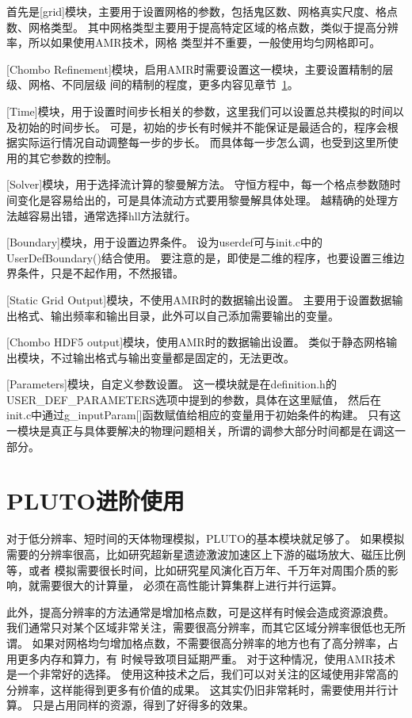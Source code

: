 首先是[grid]模块，主要用于设置网格的参数，包括鬼区数、网格真实尺度、格点数、网格类型。
其中网格类型主要用于提高特定区域的格点数，类似于提高分辨率，所以如果使用AMR技术，网格
类型并不重要，一般使用均匀网格即可。

[Chombo Refinement]模块，启用AMR时需要设置这一模块，主要设置精制的层级、网格、不同层级
间的精制的程度，更多内容见章节~\ref{PLUTOmore}。

[Time]模块，用于设置时间步长相关的参数，这里我们可以设置总共模拟的时间以及初始的时间步长。
可是，初始的步长有时候并不能保证是最适合的，程序会根据实际运行情况自动调整每一步的步长。
而具体每一步怎么调，也受到这里所使用的其它参数的控制。

[Solver]模块，用于选择流计算的黎曼解方法。
守恒方程中，每一个格点参数随时间变化是容易给出的，可是具体流动方式要用黎曼解具体处理。
越精确的处理方法越容易出错，通常选择hll方法就行。

[Boundary]模块，用于设置边界条件。
设为userdef可与init.c中的UserDefBoundary()结合使用。
要注意的是，即使是二维的程序，也要设置三维边界条件，只是不起作用，不然报错。

[Static Grid Output]模块，不使用AMR时的数据输出设置。
主要用于设置数据输出格式、输出频率和输出目录，此外可以自己添加需要输出的变量。

[Chombo HDF5 output]模块，使用AMR时的数据输出设置。
类似于静态网格输出模块，不过输出格式与输出变量都是固定的，无法更改。

[Parameters]模块，自定义参数设置。
这一模块就是在definition.h的USER\_DEF\_PARAMETERS选项中提到的参数，具体在这里赋值，
然后在init.c中通过g\_inputParam[]函数赋值给相应的变量用于初始条件的构建。
只有这一模块是真正与具体要解决的物理问题相关，所谓的调参大部分时间都是在调这一部分。

\section{PLUTO进阶使用}
\label{PLUTOmore}
对于低分辨率、短时间的天体物理模拟，PLUTO的基本模块就足够了。
如果模拟需要的分辨率很高，比如研究超新星遗迹激波加速区上下游的磁场放大、磁压比例等，或者
模拟需要很长时间，比如研究星风演化百万年、千万年对周围介质的影响，就需要很大的计算量，
必须在高性能计算集群上进行并行运算。

此外，提高分辨率的方法通常是增加格点数，可是这样有时候会造成资源浪费。
我们通常只对某个区域非常关注，需要很高分辨率，而其它区域分辨率很低也无所谓。
如果对网格均匀增加格点数，不需要很高分辨率的地方也有了高分辨率，占用更多内存和算力，有
时候导致项目延期严重。
对于这种情况，使用AMR技术是一个非常好的选择。
使用这种技术之后，我们可以对关注的区域使用非常高的分辨率，这样能得到更多有价值的成果。
这其实仍旧非常耗时，需要使用并行计算。
只是占用同样的资源，得到了好得多的效果。

